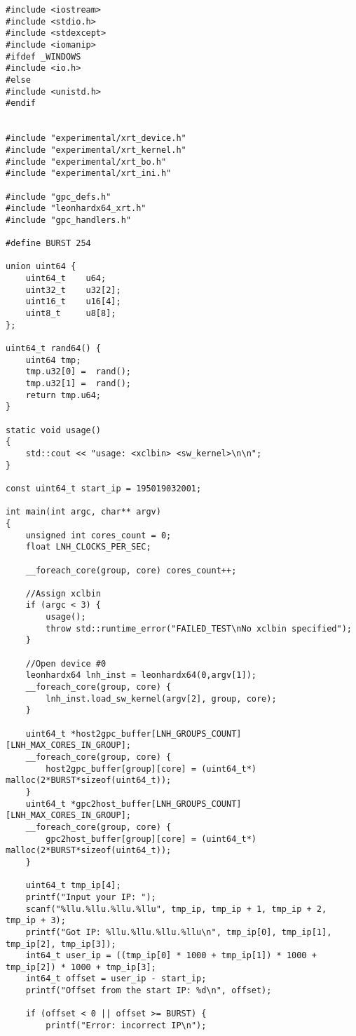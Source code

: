 \captionsetup{singlelinecheck = false, justification=raggedright}
\begin{lstlisting}[label=full2, caption=host\_main.cpp]
#include <iostream>
#include <stdio.h>
#include <stdexcept>
#include <iomanip>
#ifdef _WINDOWS
#include <io.h>
#else
#include <unistd.h>
#endif


#include "experimental/xrt_device.h"
#include "experimental/xrt_kernel.h"
#include "experimental/xrt_bo.h"
#include "experimental/xrt_ini.h"

#include "gpc_defs.h"
#include "leonhardx64_xrt.h"
#include "gpc_handlers.h"

#define BURST 254

union uint64 {
	uint64_t 	u64;
	uint32_t 	u32[2];
	uint16_t 	u16[4];   
	uint8_t 	u8[8];   
};

uint64_t rand64() {
	uint64 tmp;
	tmp.u32[0] =  rand();
	tmp.u32[1] =  rand();
	return tmp.u64;
}

static void usage()
{
	std::cout << "usage: <xclbin> <sw_kernel>\n\n";
}

const uint64_t start_ip = 195019032001;

int main(int argc, char** argv)
{
	unsigned int cores_count = 0;
	float LNH_CLOCKS_PER_SEC;
	
	__foreach_core(group, core) cores_count++;
	
	//Assign xclbin
	if (argc < 3) {
		usage();
		throw std::runtime_error("FAILED_TEST\nNo xclbin specified");
	}
	
	//Open device #0
	leonhardx64 lnh_inst = leonhardx64(0,argv[1]);
	__foreach_core(group, core) {
		lnh_inst.load_sw_kernel(argv[2], group, core);
	}
	
	uint64_t *host2gpc_buffer[LNH_GROUPS_COUNT][LNH_MAX_CORES_IN_GROUP];
	__foreach_core(group, core) {
		host2gpc_buffer[group][core] = (uint64_t*) malloc(2*BURST*sizeof(uint64_t));
	}
	uint64_t *gpc2host_buffer[LNH_GROUPS_COUNT][LNH_MAX_CORES_IN_GROUP];
	__foreach_core(group, core) {
		gpc2host_buffer[group][core] = (uint64_t*) malloc(2*BURST*sizeof(uint64_t));
	}
	
	uint64_t tmp_ip[4];
	printf("Input your IP: ");
	scanf("%llu.%llu.%llu.%llu", tmp_ip, tmp_ip + 1, tmp_ip + 2, tmp_ip + 3);
	printf("Got IP: %llu.%llu.%llu.%llu\n", tmp_ip[0], tmp_ip[1], tmp_ip[2], tmp_ip[3]);
	int64_t user_ip = ((tmp_ip[0] * 1000 + tmp_ip[1]) * 1000 + tmp_ip[2]) * 1000 + tmp_ip[3];
	int64_t offset = user_ip - start_ip;
	printf("Offset from the start IP: %d\n", offset);
	
	if (offset < 0 || offset >= BURST) {
		printf("Error: incorrect IP\n");
		

\end{lstlisting}
